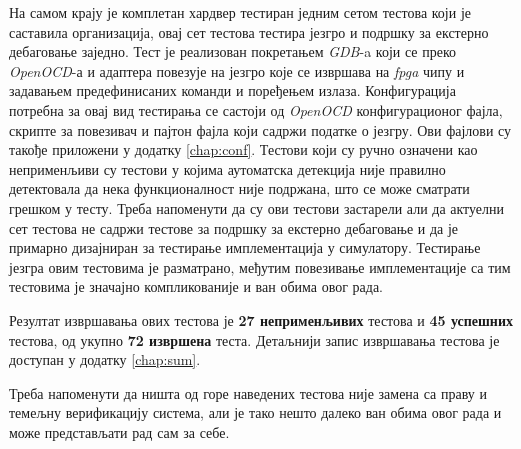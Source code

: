 На самом крају је комплетан хардвер тестиран једним сетом тестова који је саставила  организација, овај сет тестова тестира језгро и подршку за екстерно дебаговање заједно.
Тест је реализован покретањем \textit{\acrshort{GDB}}-a који се преко \textit{Open\acrshort{OCD}}-а и адаптера повезује на језгро које се извршава на \textit{\acrshort{fpga}} чипу и задавањем предефинисаних команди и поређењем излаза. Конфигурација потребна за овај вид тестирања се састоји од \textit{Open\acrshort{OCD}} конфигурационог фајла, скрипте за повезивач и пајтон фајла који садржи податке о језгру. Ови фајлови су такође приложени у додатку \ref{chap:conf}. Тестови који су ручно означени као неприменљиви су тестови у којима аутоматска детекција није правилно детектовала да нека функционалност није подржана, што се може сматрати грешком у тесту. Треба напоменути да су ови тестови застарели али да актуелни сет тестова не садржи тестове за подршку за екстерно дебаговање и да је примарно дизајниран за тестирање имплементација у симулатору. Тестирање језгра овим тестовима је разматрано, међутим повезивање имплементације са тим тестовима је значајно компликованије и ван обима овог рада.

Резултат извршавања ових тестова је \textbf{27 неприменљивих} тестова и \textbf{45 успешних} тестова, од укупно \textbf{72 извршена} теста.
Детаљнији запис извршавања тестова је доступан у  додатку \ref{chap:sum}.

Треба напоменути да ништа од горе наведених тестова није замена са праву и темељну верификацију система, али је тако нешто далеко ван обима овог рада и може представљати рад сам за себе.

